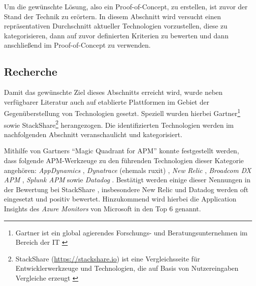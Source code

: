 
%
%

Um die gewünschte Lösung, also ein Proof-of-Concept, zu erstellen, ist zuvor der Stand der Technik zu erörtern. In diesem Abschnitt wird versucht einen repräsentativen Durchschnitt aktueller Technologien vorzustellen, diese zu kategorisieren, dann auf zuvor definierten Kriterien zu bewerten und dann anschließend im Proof-of-Concept zu verwenden.

\subsection{Recherche}

Damit das gewünschte Ziel dieses Abschnitts erreicht wird, wurde neben verfügbarer Literatur auch auf etablierte Plattformen im Gebiet der Gegenüberstellung von Technologien gesetzt. Speziell wurden hierbei Gartner\footnote{Gartner ist ein global agierendes Forschungs- und Beratungsunternehmen im Bereich der IT \cite{GartnerDefinition}} sowie StackShare\footnote{StackShare (\url{https://stackshare.io}) ist eine Vergleichsseite für Entwicklerwerkzeuge und Technologien, die auf Basis von Nutzereingaben Vergleiche erzeugt \cite{StackshareDefinition}} herangezogen. Die identifizierten Technologien werden im nachfolgenden Abschnitt veranschaulicht und kategorisiert. 

Mithilfe von Gartners \enquote{Magic Quadrant for APM} \cite{GartnerMagicQuadrantForAPM} konnte festgestellt werden, dass folgende APM-Werkzeuge zu den führenden Technologien dieser Kategorie angehören: \textit{AppDynamics} \cite{AppDynamics}, \textit{Dynatrace} (ehemals ruxit) \cite{Dynatrace}, \textit{New Relic} \cite{NewRelic}, \textit{Broadcom DX APM} \cite{BroadcomDXAPM}, \textit{Splunk APM} \cite{SplunkAPM} sowie \textit{Datadog} \cite{Datadog}. Bestätigt werden einige dieser Nennungen in der Bewertung bei StackShare \cite{StackShareAPM}, insbesondere New Relic und Datadog werden oft eingesetzt und positiv bewertet. Hinzukommend wird hierbei die Application Insights \cite{AzureApplicationInsights} des \textit{Azure Monitors} von Microsoft in den Top 6 genannt.

